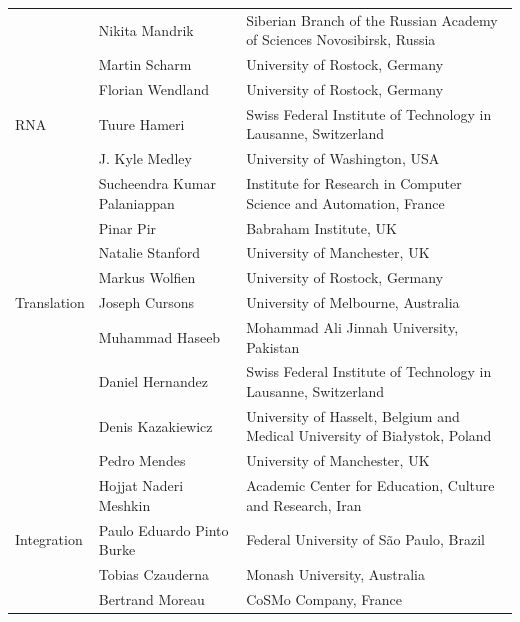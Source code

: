 \documentclass[journal,transmag]{IEEEtran}
\begin{document}
\begin{table}[ht!]
\begin{tabularx}{\textwidth}{llX}
                          & Nikita Mandrik                   & Siberian Branch of the Russian Academy of Sciences Novosibirsk, Russia\\
                          & Martin Scharm                    & University of Rostock, Germany\\
                          & Florian Wendland                 & University of Rostock, Germany\\
\midrule
RNA                       & Tuure Hameri                     & Swiss Federal Institute of Technology in Lausanne, Switzerland\\
                          & J. Kyle Medley                   & University of Washington, USA\\
                          & Sucheendra Kumar Palaniappan     & Institute for Research in Computer Science and Automation, France\\
                          & Pinar Pir                        & Babraham Institute, UK\\
                          & Natalie Stanford                 & University of Manchester, UK\\
                          & Markus Wolfien                   & University of Rostock, Germany\\
\midrule
Translation               & Joseph Cursons                   & University of Melbourne, Australia\\
                          & Muhammad Haseeb                  & Mohammad Ali Jinnah University, Pakistan\\
                          & Daniel Hernandez                 & Swiss Federal Institute of Technology in Lausanne, Switzerland\\
                          & Denis Kazakiewicz                & University of Hasselt, Belgium and Medical University of Bia\l{}ystok, Poland\\
                          & Pedro Mendes                     & University of Manchester, UK\\
                          & Hojjat Naderi Meshkin            & Academic Center for Education, Culture and Research, Iran\\
\midrule
Integration               & Paulo Eduardo Pinto Burke        & Federal University of S\~ao Paulo, Brazil\\
                          & Tobias Czauderna                 & Monash University, Australia\\
                          & Bertrand Moreau                  & CoSMo Company, France\\

\end{tabularx}
\end{table}
\end{document}
